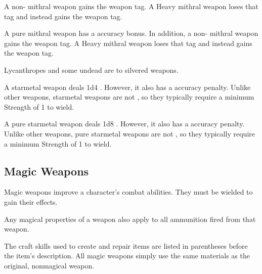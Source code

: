        A non- mithral weapon gains the  weapon tag.
      A Heavy mithral weapon loses that tag and instead gains the  weapon tag.

       A pure mithral weapon has a  accuracy bonus.
      In addition, a non- mithral weapon gains the  weapon tag.
      A Heavy mithral weapon loses that tag and instead gains the  weapon tag.

       Lycanthropes and some undead are  to silvered weapons.

       A starmetal weapon deals \plus1d4 .
      However, it also has a  accuracy penalty.
      Unlike other weapons, starmetal weapons are not , so they typically require a minimum Strength of 1 to wield.

       A pure starmetal weapon deals \plus1d8 .
      However, it also has a  accuracy penalty.
      Unlike other weapons, pure starmetal weapons are not , so they typically require a minimum Strength of 1 to wield.

      \begin{longcolumn}
        \section{Magic Weapons}
          \begin{longtablepreface}

            Magic weapons improve a character's combat abilities.
            They must be wielded to gain their effects.

             Any magical properties of a  weapon also apply to all ammunition fired from that weapon.

             The craft skills used to create and repair items are listed in parentheses before the item's description.
            All magic weapons simply use the same materials as the original, nonmagical weapon.
          \end{longtablepreface}

          

      \end{longcolumn}

